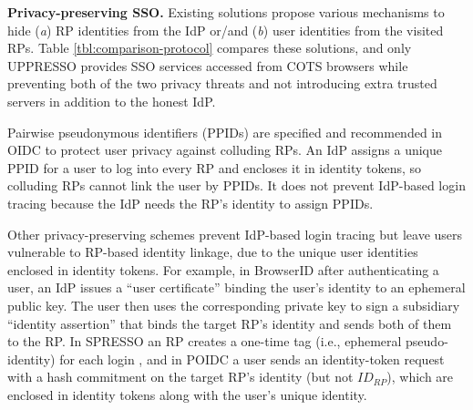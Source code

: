 \noindent\textbf{Privacy-preserving SSO.}
Existing solutions propose various mechanisms to hide (\emph{a}) RP identities from the IdP or/and (\emph{b}) user identities from the visited RPs.
Table \ref{tbl:comparison-protocol} compares these solutions,
and only UPPRESSO provides SSO services accessed from COTS browsers while preventing both of the two privacy threats and not introducing extra trusted servers in addition to the honest IdP.


Pairwise pseudonymous identifiers (PPIDs) are specified \cite{OpenIDConnect, SAMLIdentifier} and recommended \cite{NIST2017draft} in OIDC to protect user privacy against colluding RPs.
An IdP assigns a unique PPID for a user to log into every RP and encloses it in identity tokens, so colluding RPs cannot link the user by PPIDs.
It does not prevent IdP-based login tracing because the IdP needs the RP's identity to assign PPIDs.

Other privacy-preserving schemes prevent IdP-based login tracing but leave users vulnerable to RP-based identity linkage, due to the unique user identities enclosed in identity tokens.
For example, in BrowserID \cite{BrowserID} 
after authenticating a user,
    an IdP %
issues a ``user certificate'' binding the user's identity to an ephemeral public key.
The user then uses the corresponding private key to sign a subsidiary ``identity assertion'' that binds the target RP's identity and sends both of them to the RP.
In SPRESSO an RP creates a one-time tag (i.e., ephemeral pseudo-identity) for each login \cite{SPRESSO},
 and in POIDC \cite{POIDC,save-flow} a user sends an identity-token request with a hash commitment on the target RP's identity (but not $ID_{RP}$),
        which are enclosed in identity tokens along with the user's unique identity.


